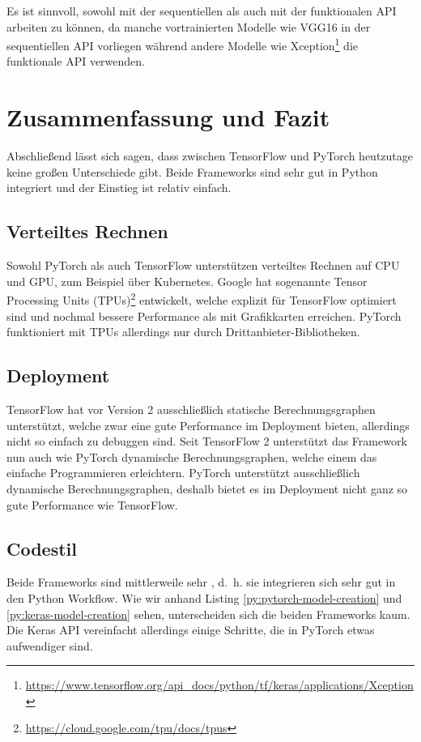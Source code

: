 
Es ist sinnvoll, sowohl mit der sequentiellen als auch mit der funktionalen API arbeiten zu können, da manche vortrainierten Modelle wie VGG16 in der 
sequentiellen API vorliegen während andere Modelle wie Xception\footnote{\url{https://www.tensorflow.org/api_docs/python/tf/keras/applications/Xception}}
die funktionale API verwenden.

\section{Zusammenfassung und Fazit}


Abschließend lässt sich sagen, dass zwischen TensorFlow und PyTorch heutzutage keine großen Unterschiede gibt. 
Beide Frameworks sind sehr gut in Python integriert und der Einstieg ist relativ einfach. %

\subsection{Verteiltes Rechnen}
Sowohl PyTorch als auch TensorFlow unterstützen verteiltes Rechnen auf CPU und GPU, zum Beispiel über Kubernetes. 
Google hat sogenannte Tensor Processing Units (TPUs)\footnote{\url{https://cloud.google.com/tpu/docs/tpus}} entwickelt, 
welche explizit für TensorFlow optimiert sind und nochmal bessere Performance als mit Grafikkarten erreichen. 
PyTorch funktioniert mit TPUs allerdings nur durch Drittanbieter-Bibliotheken. 

\subsection{Deployment}
TensorFlow hat vor Version 2 ausschließlich statische Berechnungsgraphen unterstützt, welche zwar eine gute Performance im Deployment bieten, 
allerdings nicht so einfach zu debuggen sind. Seit TensorFlow 2 unterstützt das Framework nun auch wie PyTorch dynamische Berechnungsgraphen, 
welche einem das einfache Programmieren erleichtern. PyTorch unterstützt ausschließlich dynamische Berechnungsgraphen, deshalb bietet es im 
Deployment nicht ganz so gute Performance wie TensorFlow. 

\subsection{Codestil}
Beide Frameworks sind mittlerweile sehr , d.~h. sie integrieren sich sehr gut in den Python Workflow. 
Wie wir anhand Listing \ref{py:pytorch-model-creation} und \ref{py:keras-model-creation} sehen, unterscheiden sich die beiden Frameworks kaum. 
Die Keras API vereinfacht allerdings einige Schritte, die in PyTorch etwas aufwendiger sind. 

